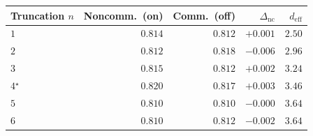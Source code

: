 \begin{tabular}{lrrrr}
\toprule
Truncation $n$ & Noncomm.\ (on) & Comm.\ (off) & $\Delta_{\mathrm{nc}}$ & $d_{\mathrm{eff}}$ \\
\midrule
$1$ & $0.814$ & $0.812$ & $+0.001$ & $2.50$ \\
$2$ & $0.812$ & $0.818$ & $-0.006$ & $2.96$ \\
$3$ & $0.815$ & $0.812$ & $+0.002$ & $3.24$ \\
$4$$^{\star}$ & $0.820$ & $0.817$ & $+0.003$ & $3.46$ \\
$5$ & $0.810$ & $0.810$ & $-0.000$ & $3.64$ \\
$6$ & $0.810$ & $0.812$ & $-0.002$ & $3.64$ \\
\bottomrule
\end{tabular}
